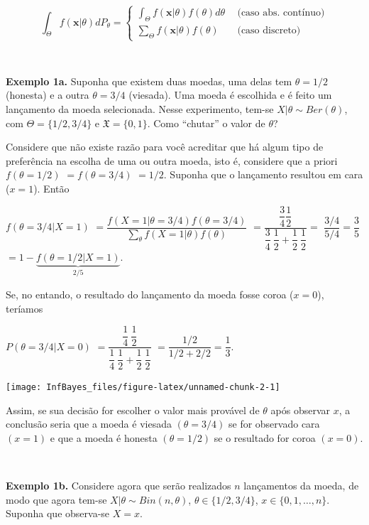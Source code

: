 \documentclass[
]{book}
\begin{document}
\[\displaystyle \int_{\Theta}f(\boldsymbol x|\theta)dP_\theta
= \left\{ \begin{array}{ll} \displaystyle \int_{\Theta}f(\boldsymbol x|\theta) f(\theta) d\theta ~&~ \text{(caso abs. contínuo)}\\ \displaystyle \sum_{\Theta}f(\boldsymbol x|\theta) f(\theta) ~&~ \text{(caso discreto)} \end{array}\right.\]

\(~\)

\textbf{Exemplo 1a.} Suponha que existem duas moedas, uma delas tem \(\theta =1/2\) (honesta) e a outra \(\theta=3/4\) (viesada). Uma moeda é escolhida e é feito um lançamento da moeda selecionada. Nesse experimento, tem-se \(X|\theta \sim Ber(\theta)\), com \(\Theta=\{1/2,3/4\}\) e \(\mathfrak{X}=\{0,1\}\). Como ``chutar'' o valor de \(\theta\)?

Considere que não existe razão para você acreditar que há algum tipo de preferência na escolha de uma ou outra moeda, isto é, considere que a priori \(f(\theta=1/2)\) \(=f(\theta=3/4)\) \(=1/2\). Suponha que o lançamento resultou em cara (\(x=1\)). Então

\(f(\theta = 3/4|X=1)\) \(=\dfrac{f(X=1|\theta=3/4)f(\theta=3/4)}{\sum_\theta f(X=1|\theta)f(\theta)}\) \(=\dfrac{\dfrac{3}{4}\dfrac{1}{2}}{\dfrac{3}{4}~\dfrac{1}{2}+\dfrac{1}{2}~\dfrac{1}{2}}=\) \(\dfrac{3/4}{5/4}=\dfrac{3}{5}\) \(= 1-\underbrace{f(\theta=1/2|X=1)}_{2/5}\).

Se, no entando, o resultado do lançamento da moeda fosse coroa (\(x=0\)), teríamos

\(P(\theta=3/4|X=0)\) \(=\dfrac{\dfrac{1}{4}~\dfrac{1}{2}}{\dfrac{1}{4}~\dfrac{1}{2}+\dfrac{1}{2}~\dfrac{1}{2}}\) \(=\dfrac{1/2}{1/2+2/2}=\dfrac{1}{3}\).

\begin{center}\texttt{[image: InfBayes\_files/figure-latex/unnamed-chunk-2-1]} \end{center}

Assim, se sua decisão for escolher o valor mais provável de \(\theta\) após observar \(x\), a conclusão seria que a moeda é viesada \((\theta=3/4)\) se for observado cara \((x=1)\) e que a moeda é honesta \((\theta=1/2)\) se o resultado for coroa \((x=0)\).

\(~\)

\textbf{Exemplo 1b.} Considere agora que serão realizados \(n\) lançamentos da moeda, de modo que agora tem-se \(X|\theta \sim Bin(n,\theta)\), \(\theta \in \{1/2,3/4\}\), \(x \in \{0,1,\ldots,n\}\). Suponha que observa-se \(X=x\).
\end{document}
